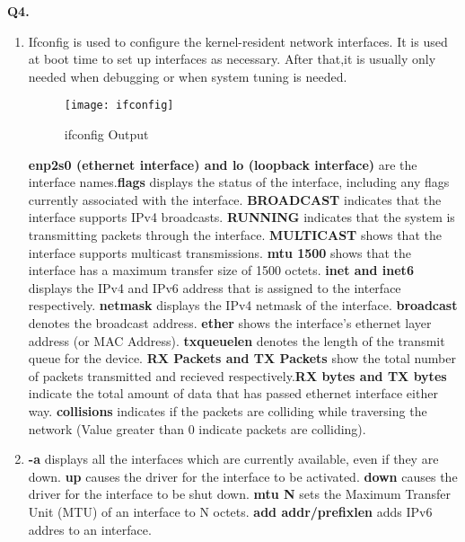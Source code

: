 \documentclass[12pt]{report}
\begin{document}
	\vspace*{10px}
	\large{\textbf{Q4.}}
	\linebreak[1]
	\normalsize{}
	\begin{enumerate}[label=\textbf{(\alph*)}]
		\item \textbf{} Ifconfig  is  used to configure the kernel-resident network interfaces. It is used at boot time to set up interfaces as necessary.  After that,it  is  usually  only  needed  when  debugging or when system tuning is needed. \\[1pt]
		\pagebreak
		\vspace*{10px}
		\begin{figure}[H]
			\centering
			\texttt{[image: ifconfig]}
			\caption{ifconfig Output}
		\end{figure}
		\textbf{enp2s0 (ethernet interface) and lo (loopback interface)} are the interface names.\textbf{flags} displays the status of the interface, including any flags currently associated with the interface. \textbf{BROADCAST} indicates that the interface supports IPv4 broadcasts. \textbf{RUNNING} indicates that the system is transmitting packets through the interface. \textbf{MULTICAST} shows that the interface supports multicast transmissions. \textbf{mtu 1500} shows that the interface has a maximum transfer size of 1500 octets. \textbf{inet and inet6} displays the IPv4 and IPv6 address that is assigned to the interface respectively. \textbf{netmask} displays the IPv4 netmask of the interface. \textbf{broadcast} denotes the broadcast address. \textbf{ether} shows the interface's ethernet layer address (or MAC Address). \textbf{txqueuelen} denotes the length of the transmit queue for the device. \textbf{RX Packets and TX Packets} show the total number of packets transmitted and recieved respectively.\textbf{RX bytes and TX bytes} indicate the total amount of data that has passed ethernet interface either way. \textbf{collisions} indicates if the packets are colliding while traversing the network (Value greater than 0 indicate packets are colliding).
		
		\item \textbf{-a} displays all the interfaces which are currently available, even if they are down. \textbf{up} causes the driver for the interface to be activated. \textbf{down} causes the driver for the interface to be shut down. \textbf{mtu N} sets the Maximum Transfer Unit (MTU) of an interface to N octets. \textbf{add addr/prefixlen} adds IPv6 addres to an interface. 
		 

\end{enumerate}
\end{document}
